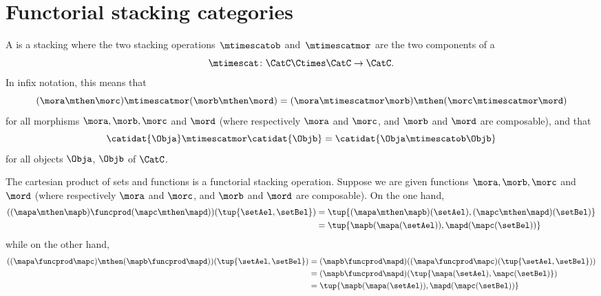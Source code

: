 
\section{Functorial stacking categories}
\label{sec:functorial-stacking}

\begin{ctdefinition}
    \label{def:functorial-stacking-cat-duplicate}
    A  is a stacking  where the two stacking operations~$\mtimescatob$ and~$\mtimescatmor$ are the two components of a  \begin{equation}
        \mtimescat\colon \CatC \Ctimes \CatC \to \CatC.
    \end{equation}
    In infix notation, this means that
    \begin{equation}
        (\mora \mthen \morc )
        \mtimescatmor (\morb \mthen \mord )
        =
        (\mora \mtimescatmor \morb )
        \mthen (\morc \mtimescatmor \mord )
    \end{equation}
    for all morphisms $\mora, \morb, \morc$ and $\mord$ (where respectively $\mora$ and $\morc$, and $\morb$ and $\mord$ are composable), and that
    \begin{equation}\label{eq:functorial-stacking-condition-identities}
        \catidat{\Obja} \mtimescatmor \catidat{\Objb} = \catidat{\Obja \mtimescatob \Objb}
    \end{equation}
    for all objects $\Obja$, $\Objb$ of $\CatC$.
\end{ctdefinition}



\begin{example}
    The cartesian product of sets and functions is a functorial stacking operation.
    Suppose we are given functions $\mora, \morb, \morc$ and $\mord$ (where respectively $\mora$ and $\morc$, and $\morb$ and $\mord$ are composable).
    On the one hand,
    \begin{align}
        ((\mapa \mthen \mapb) \funcprod (\mapc \mthen \mapd))(\tup{\setAel, \setBel}) & = \tup{(\mapa \mthen \mapb)(\setAel), (\mapc \mthen \mapd)(\setBel)} \\
                                                                                      & = \tup{\mapb(\mapa(\setAel)), \mapd(\mapc(\setBel))}
    \end{align}
    while on the other hand,
    \begin{align}
        ((\mapa \funcprod \mapc) \mthen (\mapb \funcprod \mapd))(\tup{\setAel, \setBel}) & = (\mapb \funcprod \mapd)((\mapa \funcprod \mapc)(\tup{\setAel, \setBel})) \\
                                                                                         & = (\mapb \funcprod \mapd)(\tup{\mapa(\setAel),  \mapc(\setBel)}) \\
                                                                                         & = \tup{\mapb(\mapa(\setAel)), \mapd(\mapc(\setBel))}
    \end{align}
\end{example}

